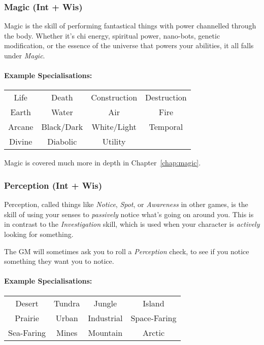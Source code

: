 \subsubsection{Magic (Int + Wis)}
Magic is the skill of performing fantastical things with power channelled through the body.
Whether it's chi energy, spiritual power, nano-bots, genetic modification, or the essence of the universe that powers your abilities, it all falls under \textit{Magic}.

\paragraph{Example Specialisations:}
\begin{center}
  \begin{tabular}{c|c|c|c}
    Life  & Death & Construction & Destruction \\
    Earth & Water & Air & Fire \\
    Arcane & Black/Dark & White/Light & Temporal \\
    Divine & Diabolic   & Utility
  \end{tabular}
\end{center}
Magic is covered much more in depth in Chapter~\ref{chap:magic}.

\subsubsection{Perception (Int + Wis)}
Perception, called things like \textit{Notice}, \textit{Spot}, or \textit{Awareness} in other games, is the skill of using your senses to \textit{passively} notice what's going on around you.
This is in contrast to the \textit{Investigation} skill, which is used when your character is \textit{actively} looking for something.

The GM will sometimes ask you to roll a \textit{Perception} check, to see if you notice something they want you to notice.

\paragraph{Example Specialisations:}
\begin{center}
    \begin{tabular}{c|c|c|c}
        Desert & Tundra & Jungle & Island \\
        Prairie & Urban & Industrial & Space-Faring \\
        Sea-Faring & Mines & Mountain & Arctic \\
    \end{tabular}
\end{center}

